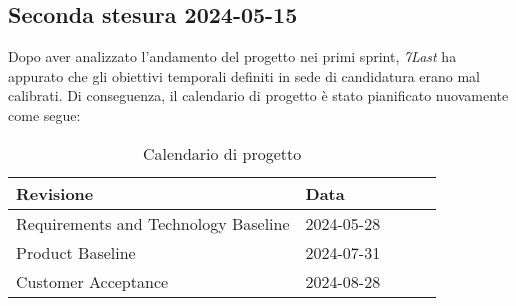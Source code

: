\subsection{Seconda stesura 2024-05-15}
Dopo aver analizzato l'andamento del progetto nei primi sprint, \textit{7Last} ha appurato che gli obiettivi temporali definiti in sede di candidatura erano mal calibrati. Di conseguenza, il calendario di progetto è stato pianificato nuovamente come segue:
\begin{table}[!h]
    \begin{center}
        \begin{tabular}{ | l | l | l | l | l | }
            \hline
            Revisione                               & Data       \\ \hline
            Requirements and Technology Baseline    & 2024-05-28 \\
            Product Baseline                        & 2024-07-31 \\
            Customer Acceptance                     & 2024-08-28 \\
            \hline
        \end{tabular}
    \end{center}
    \caption{Calendario di progetto}
    \label{tab:11}
\end{table}